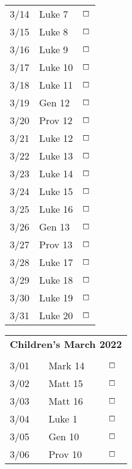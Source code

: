 \documentclass[10pt,landscape,letterpaper]{article}
\begin{document}
\begin{multicols}{5}
\begin{tabular}{p{0.5in}p{0.65in}p{0.3in}}
3/14 & Luke 7 & $\boxempty$ \\
3/15 & Luke 8 & $\boxempty$ \\
3/16 & Luke 9 & $\boxempty$ \\
3/17 & Luke 10 & $\boxempty$ \\
3/18 & Luke 11 & $\boxempty$ \\
\textcolor[rgb]{1.00,0.00,0.00}{3/19} & \textcolor[rgb]{1.00,0.00,0.00}{Gen 12} & $\boxempty$ \\
\textcolor[rgb]{1.00,0.00,0.00}{3/20} & \textcolor[rgb]{1.00,0.00,0.00}{Prov 12} & $\boxempty$ \\

3/21 & Luke 12 & $\boxempty$ \\
3/22 & Luke 13 & $\boxempty$ \\
3/23 & Luke 14 & $\boxempty$ \\
3/24 & Luke 15 & $\boxempty$ \\
3/25 & Luke 16 & $\boxempty$ \\
\textcolor[rgb]{1.00,0.00,0.00}{3/26} & \textcolor[rgb]{1.00,0.00,0.00}{Gen 13} & $\boxempty$ \\
\textcolor[rgb]{1.00,0.00,0.00}{3/27} & \textcolor[rgb]{1.00,0.00,0.00}{Prov 13} & $\boxempty$ \\

3/28 & Luke 17 & $\boxempty$ \\
3/29 & Luke 18 & $\boxempty$ \\
3/30 & Luke 19 & $\boxempty$ \\
3/31 & Luke 20 & $\boxempty$ \\

\end{tabular}





\begin{tabular}{p{0.5in}p{0.65in}p{0.3in}}
\multicolumn{3}{c}{\textbf{Children's March 2022}} \\
     &       &             \\
3/01 & Mark 14 & $\boxempty$ \\
3/02 & Matt 15 & $\boxempty$ \\
3/03 & Matt 16 & $\boxempty$ \\
3/04 & Luke 1 & $\boxempty$ \\
\textcolor[rgb]{1.00,0.00,0.00}{3/05} & \textcolor[rgb]{1.00,0.00,0.00}{Gen 10} & $\boxempty$ \\
\textcolor[rgb]{1.00,0.00,0.00}{3/06} & \textcolor[rgb]{1.00,0.00,0.00}{Prov 10} & $\boxempty$ \\


\end{tabular}
\end{multicols}
\end{document}
